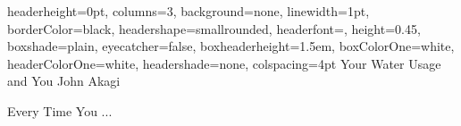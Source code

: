 \documentclass[paperwidth=11in,paperheight=8.5in,fontscale=1]{baposter} %
\begin{document}
\begin{poster}{
  headerheight=0pt,
  columns=3,
  background=none,
  linewidth=1pt,
  borderColor=black,
  headershape=smallrounded,
  headerfont={},
  height=0.45,
  boxshade=plain,
  eyecatcher=false,
  boxheaderheight=1.5em,
  boxColorOne=white,
  headerColorOne=white,
  headershade=none,
  colspacing=4pt
}
{
} %
{
Your Water Usage and You 
} %
{
John Akagi
}
{
} %

\begin{posterbox}[column=0,row=.05,span=1,textborder=rounded,headerborder=open,height=.6,name=misc,textfont=\footnotesize, boxheaderheight=.25in]{ Every Time You ...}

\begin{minipage}[b][][b]{.24\textwidth}

\end{minipage}
\end{posterbox}
\end{poster}
\end{document}
